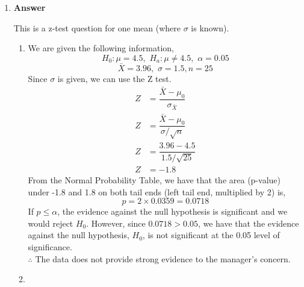 \documentclass[12pt]{book}
\begin{document}
\newcommand{\reporttitle}{Assignment 3}
\newcommand{\reportauthorOne}{Kien Do}
\newcommand{\cidOne}{300163370}






\begin{enumerate}
    \item \textbf{Answer}
    
    This is a z-test question for one mean (where $\sigma$ is known).
    
    \begin{enumerate}
        \item
        
        We are given the following information,
        $$ H_0: \mu = 4.5, \,\, H_a: \mu \neq 4.5, \,\, \alpha = 0.05$$
        $$\bar{X} = 3.96, \,\, \sigma = 1.5, n = 25$$
        Since $\sigma$ is given, we can use the Z test.
        \begin{align*}
            Z &= \dfrac{\bar{X} - \mu_0}{\sigma_{\bar{X}}}\\
            Z &= \dfrac{\bar{X} - \mu_0}{\sigma / \sqrt{n}}\\
            Z &= \dfrac{3.96 - 4.5}{1.5 / \sqrt{25}}\\
            Z &= -1.8
        \end{align*}
        From the Normal Probability Table, we have that the area (p-value) under -1.8 and 1.8 on both tail ends (left tail end, multiplied by 2) is,
        $$p = 2 \times 0.0359 = 0.0718$$
        If $p \leq \alpha$, the evidence against the null hypothesis is significant and we would reject $H_0$. However, since $0.0718 > 0.05$, we have that the evidence against the null hypothesis, $H_0$, is not significant at the 0.05 level of significance.\\
        
        $\therefore$ The data does not provide strong evidence to the manager’s concern.
        
        \item
        

\end{enumerate}
\end{enumerate}
\end{document}
